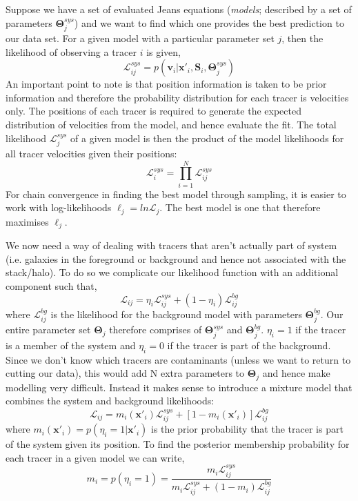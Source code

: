 Suppose we have a set of evaluated Jeans equations (\textit{models}; described by a set of parameters $\boldsymbol{\Theta}^{sys}_{j}$) and we want to find which one provides the best prediction to our data set. For a given model with a particular parameter set $j$, then the likelihood of observing a tracer $i$ is given, 
\begin{equation}
\mathcal{L}^{sys}_{ij} = p (\boldsymbol{v}_{i}|\boldsymbol{x}'_{i},\boldsymbol{S}_{i},\boldsymbol{\Theta}^{sys}_{j})
\end{equation}
An important point to note is that position information is taken to be prior information and therefore the probability distribution for each tracer is velocities only. The positions of each tracer is required to generate the expected distribution of velocities from the model, and hence evaluate the fit. The total likelihood $\mathcal{L}^{sys}_{j}$ of a given model is then the product of the model likelihoods for all tracer velocities given their positions:
\begin{equation}
\mathcal{L}^{sys}_{i} = \prod^{N}_{i=1} \mathcal{L}^{sys}_{ij}
\end{equation}
For chain convergence in finding the best model through sampling, it is easier to work with log-likelihoods $\ell_j = ln\mathcal{L}_{j}$. The best model is one that therefore maximises $\ell_j$. 

We now need a way of dealing with tracers that aren't actually part of system (i.e. galaxies in the foreground or background and hence not associated with the stack/halo). To do so we complicate our likelihood function with an additional component such that, 
\begin{equation}
\mathcal{L}_{ij} = \eta_{i}\mathcal{L}^{sys}_{ij} + (1-\eta_i)\mathcal{L}_{ij}^{bg}
\end{equation}
where $\mathcal{L}^{bg}_{ij}$ is the likelihood for the background model with parameters $\boldsymbol{\Theta}^{bg}_{j}$. Our entire parameter set $\boldsymbol{\Theta}_{j}$ therefore comprises of $\boldsymbol{\Theta}^{sys}_{j}$ and $\boldsymbol{\Theta}^{bg}_{j}$. $\eta_{i} = 1$ if the tracer is a member of the system and $\eta_{i} = 0$ if the tracer is part of the background. Since we don't know which tracers are contaminants (unless we want to return to cutting our data), this would add N extra parameters to $\boldsymbol{\Theta}_{j}$ and hence make modelling very difficult. Instead it makes sense to introduce a mixture model that combines the system and background likelihoods:
\begin{equation}
\mathcal{L}_{ij} = m_{i}(\boldsymbol{x}'_{i})\mathcal{L}^{sys}_{ij} + [1 - m_{i}(\boldsymbol{x}'_{i})]\mathcal{L}^{bg}_{ij}
\end{equation}
where $m_{i}(\boldsymbol{x}'_{i}) = p(\eta_{i} = 1| \boldsymbol{x}'_{i})$ is the prior probability that the tracer is part of the system given its position. To find the posterior membership probability for each tracer in a given model we can write,
\begin{equation}
m_{i} = p(\eta_i = 1) = \frac{m_{i}\mathcal{L}_{ij}^{sys}}{m_{i}\mathcal{L}_{ij}^{sys} + (1 - m_i)\mathcal{L}^{bg}_{ij}}
\end{equation}

